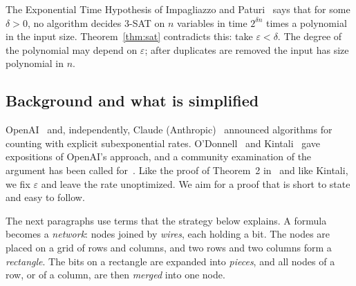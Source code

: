 \documentclass[11pt]{article}
\begin{document}
The Exponential Time Hypothesis of Impagliazzo and Paturi~\cite{IP01} says that for some $\delta>0$, no algorithm decides 3-SAT on $n$ variables in time $2^{\delta n}$ times a polynomial in the input size. Theorem~\ref{thm:sat} contradicts this: take $\varepsilon<\delta$. The degree of the polynomial may depend on $\varepsilon$; after duplicates are removed the input has size polynomial in $n$.

\subsection*{Background and what is simplified}

OpenAI~\cite{OAI26} and, independently, Claude (Anthropic)~\cite{Cla26} announced algorithms for counting with explicit subexponential rates. O'Donnell~\cite{OD26} and Kintali~\cite{Kin26} gave expositions of OpenAI's approach, and a community examination of the argument has been called for~\cite{ETHblog}. Like the proof of Theorem~2 in~\cite{Cla26} and like Kintali, we fix $\varepsilon$ and leave the rate unoptimized. We aim for a proof that is short to state and easy to follow.

The next paragraphs use terms that the strategy below explains. A formula becomes a \emph{network}: nodes joined by \emph{wires}, each holding a bit. The nodes are placed on a grid of rows and columns, and two rows and two columns form a \emph{rectangle}. The bits on a rectangle are expanded into \emph{pieces}, and all nodes of a row, or of a column, are then \emph{merged} into one node.
\end{document}
